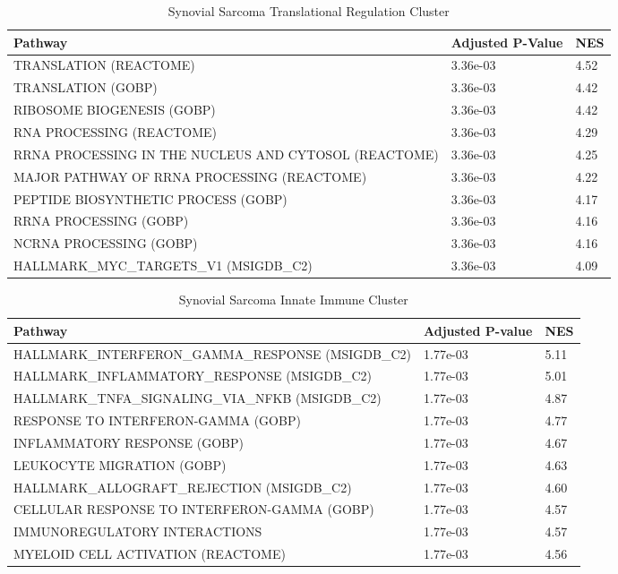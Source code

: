 \documentclass[preview]{standalone}
\begin{document}
	\begin{table}[h]
		\caption{Synovial Sarcoma Translational Regulation Cluster}
		\begin{tabular}{L{10cm}R{1.5cm}R{1.5cm}}
		\toprule
                                               Pathway &      Adjusted P-Value &   NES \\
\midrule
                                TRANSLATION (REACTOME) &  3.36e-03 &  4.52 \\
                                    TRANSLATION (GOBP) &  3.36e-03 &  4.42 \\
                            RIBOSOME BIOGENESIS (GOBP) &  3.36e-03 &  4.42 \\
                             RNA PROCESSING (REACTOME) &  3.36e-03 &  4.29 \\
RRNA PROCESSING IN THE NUCLEUS AND CYTOSOL (REACTOME) &  3.36e-03 &  4.25 \\
           MAJOR PATHWAY OF RRNA PROCESSING (REACTOME) &  3.36e-03 &  4.22 \\
                   PEPTIDE BIOSYNTHETIC PROCESS (GOBP) &  3.36e-03 &  4.17 \\
                                RRNA PROCESSING (GOBP) &  3.36e-03 &  4.16 \\
                               NCRNA PROCESSING (GOBP) &  3.36e-03 &  4.16 \\
               HALLMARK\_MYC\_TARGETS\_V1 (MSIGDB\_C2) &  3.36e-03 &  4.09 \\
\bottomrule
\end{tabular}
\end{table}


\begin{table}
	\caption{Synovial Sarcoma Innate Immune Cluster}
\begin{tabular}{L{10cm}R{1.5cm}R{1.5cm}}
	\toprule
	Pathway &      Adjusted P-value &   NES \\
	\midrule
	HALLMARK\_INTERFERON\_GAMMA\_RESPONSE (MSIGDB\_C2) &  1.77e-03 &  5.11 \\
	HALLMARK\_INFLAMMATORY\_RESPONSE (MSIGDB\_C2) &  1.77e-03 &  5.01 \\
	HALLMARK\_TNFA\_SIGNALING\_VIA\_NFKB (MSIGDB\_C2) &  1.77e-03 &  4.87 \\
	RESPONSE TO INTERFERON-GAMMA (GOBP) &  1.77e-03 &  4.77 \\
	INFLAMMATORY RESPONSE (GOBP) &  1.77e-03 &  4.67 \\
	LEUKOCYTE MIGRATION (GOBP) &  1.77e-03 &  4.63 \\
	HALLMARK\_ALLOGRAFT\_REJECTION (MSIGDB\_C2) &  1.77e-03 &  4.60 \\
	CELLULAR RESPONSE TO INTERFERON-GAMMA (GOBP) &  1.77e-03 &  4.57 \\
	IMMUNOREGULATORY INTERACTIONS  &  1.77e-03 &  4.57 \\
	MYELOID CELL ACTIVATION (REACTOME) &  1.77e-03 &  4.56 \\
	\bottomrule
\end{tabular}

\end{table}
\end{document}
